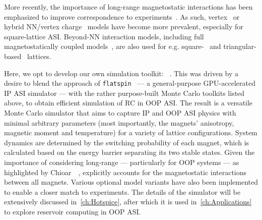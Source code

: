 More recently, the importance of long-range magnetostatic interactions has been emphasized to improve correspondence to experiments~\cite{Chioar2014,Rougemaille2011,Brunn2021}.
As such, vertex~\cite{gilbert2014emergent,Saglam2022Tetris,Goryca2021Plasma,MeltingASI} or hybrid NN/vertex charge~\cite{Canals2016,zhang2013crystallites} models have become more prevalent, especially for square-lattice ASI. %
Beyond-NN interaction models, including full magnetostatically coupled models~\cite{ApparentFMpinwheel,mengotti2011kagome}, are also used for e.g. square-~\cite{Brunn2021,Farhan2013,sklenar2019field} and triangular-based~\cite{Chioar2014,Rougemaille2011,Hofhuis2020} lattices. \par %
Here, we opt to develop our own simulation toolkit: \hotspice~\cite{MAES-24}.
This was driven by a desire to blend the approach of \texttt{flatspin}~\cite{flatspin} --- a general-purpose GPU-accelerated IP ASI simulator --- with the rather purpose-built Monte Carlo toolkits listed above, to obtain efficient simulation of RC in OOP ASI.
The result is a versatile Monte Carlo simulator that aims to capture IP and OOP ASI physics with minimal arbitrary parameters (most importantly, the magnets' anisotropy, magnetic moment and temperature) for a variety of lattice configurations.
System dynamics are determined by the switching probability of each magnet, which is calculated based on the energy barrier separating its two stable states.
Given the importance of considering long-range  --- particularly for OOP systems --- as highlighted by Chioar~\etal~\cite{Chioar2014}, \hotspice{} explicitly accounts for the magnetostatic interactions between all magnets.
Various optional model variants have also been implemented to enable a closer match to experiments.
The details of the \hotspice simulator will be extensively discussed in~\cref{ch:Hotspice}, after which it is used in~\cref{ch:Applications} to explore reservoir computing in OOP ASI.
